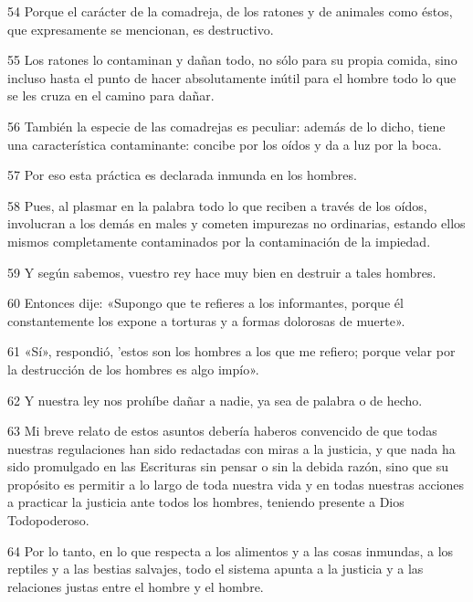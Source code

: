 \par 54 Porque el carácter de la comadreja, de los ratones y de animales como éstos, que expresamente se mencionan, es destructivo.

\par 55 Los ratones lo contaminan y dañan todo, no sólo para su propia comida, sino incluso hasta el punto de hacer absolutamente inútil para el hombre todo lo que se les cruza en el camino para dañar.

\par 56 También la especie de las comadrejas es peculiar: además de lo dicho, tiene una característica contaminante: concibe por los oídos y da a luz por la boca.

\par 57 Por eso esta práctica es declarada inmunda en los hombres.

\par 58 Pues, al plasmar en la palabra todo lo que reciben a través de los oídos, involucran a los demás en males y cometen impurezas no ordinarias, estando ellos mismos completamente contaminados por la contaminación de la impiedad.

\par 59 Y según sabemos, vuestro rey hace muy bien en destruir a tales hombres.

\par 60 Entonces dije: «Supongo que te refieres a los informantes, porque él constantemente los expone a torturas y a formas dolorosas de muerte».

\par 61 «Sí», respondió, 'estos son los hombres a los que me refiero; porque velar por la destrucción de los hombres es algo impío».

\par 62 Y nuestra ley nos prohíbe dañar a nadie, ya sea de palabra o de hecho.

\par 63 Mi breve relato de estos asuntos debería haberos convencido de que todas nuestras regulaciones han sido redactadas con miras a la justicia, y que nada ha sido promulgado en las Escrituras sin pensar o sin la debida razón, sino que su propósito es permitir a lo largo de toda nuestra vida y en todas nuestras acciones a practicar la justicia ante todos los hombres, teniendo presente a Dios Todopoderoso.

\par 64 Por lo tanto, en lo que respecta a los alimentos y a las cosas inmundas, a los reptiles y a las bestias salvajes, todo el sistema apunta a la justicia y a las relaciones justas entre el hombre y el hombre.

